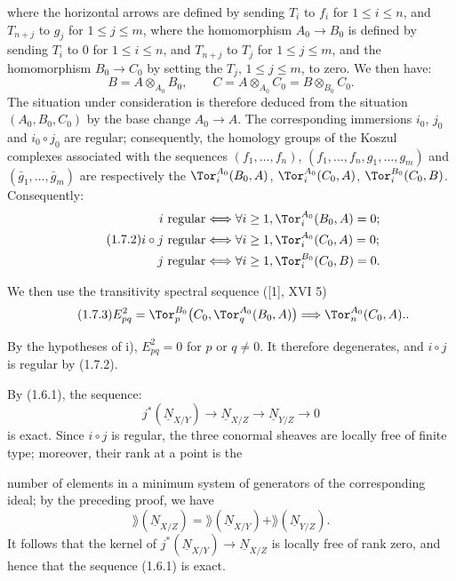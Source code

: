 %
where the horizontal arrows are defined by sending $T_i$ to $f_i$ for $1\leq i\leq n$, and $T_{n+j}$ to $g_j$ for $1\leq j\leq m$, where the homomorphism $A_0\longrightarrow B_0$ is defined by sending $T_i$ to $0$ for $1\leq i\leq n$, and $T_{n+j}$ to $T_j$ for $1\leq j\leq m$, and the homomorphism $B_0\longrightarrow C_0$ by setting the $T_j$, $1\leq j\leq m$, to zero. We then have:
\[
 B=A\otimes_{A_0}B_0,
 \qquad
 C=A\otimes_{A_0}C_0=B\otimes_{B_0}C_0.
\]
The situation under consideration is therefore deduced from the situation $(A_0,B_0,C_0)$ by the base change $A_0\longrightarrow A$. The corresponding immersions $i_0$, $j_0$ and $i_0\circ j_0$ are regular; consequently, the homology groups of the Koszul complexes associated with the sequences $(f_1,\ldots,f_n)$, $(f_1,\ldots,f_n,g_1,\ldots,g_m)$ and $(\bar g_1,\ldots,\bar g_m)$ are respectively the $\Tor_i^{A_0}(B_0,A)$, $\Tor_i^{A_0}(C_0,A)$, $\Tor_i^{B_0}(C_0,B)$. Consequently:
\begin{equation}\tag{1.7.2}
\begin{aligned}
 i\ \text{regular} &\Longleftrightarrow \forall i\geq1,
 \Tor_i^{A_0}(B_0,A)=0;\\
 i\circ j\ \text{regular} &\Longleftrightarrow \forall i\geq1,
 \Tor_i^{A_0}(C_0,A)=0;\\
 j\ \text{regular} &\Longleftrightarrow \forall i\geq1,
 \Tor_i^{B_0}(C_0,B)=0.
\end{aligned}
\end{equation}

We then use the transitivity spectral sequence ([1], XVI 5)
\begin{equation}\tag{1.7.3}
E^2_{pq}=\Tor_p^{B_0}\bigl(C_0,\Tor_q^{A_0}(B_0,A)\bigr)
\Longrightarrow \Tor_n^{A_0}(C_0,A)..
\end{equation}

By the hypotheses of i), $E^2_{pq}=0$ for $p$ or $q\ne0$. It therefore degenerates, and $i\circ j$ is regular by (1.7.2).

By (1.6.1), the sequence:
\[
 j^*(\underline{N}_{X/Y})\longrightarrow \underline{N}_{X/Z}\longrightarrow \underline{N}_{Y/Z}\longrightarrow0
\]
is exact. Since $i\circ j$ is regular, the three conormal sheaves are locally free of finite type; moreover, their rank at a point is the

%
number of elements in a minimum system of generators of the corresponding ideal; by the preceding proof, we have
\[
 \rang(\underline{N}_{X/Z})=\rang(\underline{N}_{X/Y})+\rang(\underline{N}_{Y/Z}).
\]
It follows that the kernel of $j^*(\underline{N}_{X/Y})\longrightarrow \underline{N}_{X/Z}$ is locally free of rank zero, and hence that the sequence (1.6.1) is exact.

